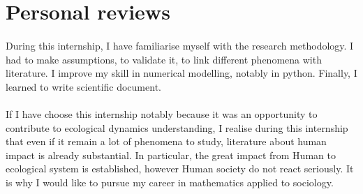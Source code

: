 \documentclass{article}
\begin{document}
 









\newpage
{}
\section*{Personal reviews}


\paragraph{}
During this internship, I have familiarise myself with  the research methodology. I had to make assumptions, to validate it, to link different phenomena with literature. I improve my skill in numerical modelling, notably in python. Finally, I learned to write scientific document.

\paragraph{}
If I have choose this internship notably because it was an opportunity to contribute to ecological dynamics understanding, I realise during this internship that even if it remain a lot of phenomena to study, literature about human impact is already substantial. In particular, the great impact from Human to ecological system is established, however Human society do not react seriously. It is why I would like to pursue my career in mathematics applied to sociology.
\end{document}
